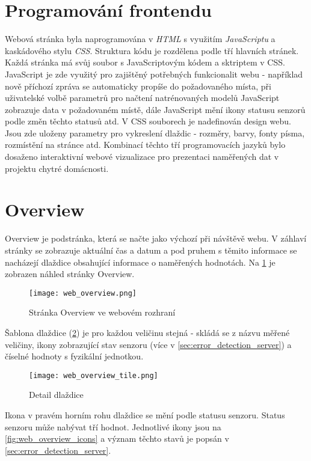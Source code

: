\section{Programování frontendu} \label{sec:frontend}
Webová stránka byla naprogramována v \textit{HTML} s využitím \textit{JavaScriptu} a kaskádového stylu \textit{CSS}. Struktura kódu je rozdělena podle tří hlavních stránek. Každá stránka má svůj soubor s JavaScriptovým kódem a sktriptem v CSS. JavaScript je zde využitý pro zajištěný potřebných funkcionalit webu - například nově příchozí zpráva se automaticky propíše do požadovaného místa, při uživatelské volbě parametrů pro načtení natrénovaných modelů JavaScript zobrazuje data v požadovaném místě, dále JavaScript mění ikony statusu senzorů podle změn těchto statusů atd. V CSS souborech je nadefinován design webu. Jsou zde uloženy parametry pro vykreslení dlaždic - rozměry, barvy, fonty písma, rozmístění na stránce atd. Kombinací těchto tří programovacích jazyků bylo dosaženo interaktivní webové vizualizace pro prezentaci naměřených dat v projektu chytré domácnosti.

\section{Overview} \label{sec:overview}

Overview je podstránka, která se načte jako výchozí při návštěvě webu. V záhlaví stránky se zobrazuje aktuální čas a datum a pod pruhem s těmito informace se nacházejí dlaždice obsahující informace o naměřených hodnotách. Na \cref{fig:web_overview} je zobrazen náhled stránky Overview. 

\begin{figure}[H]
  \centering
  \texttt{[image: web\_overview.png]}
  \caption{Stránka Overview ve webovém rozhraní}
  \label{fig:web_overview}
\end{figure}  

Šablona dlaždice (\cref{fig:web_overview_tile}) je pro každou veličinu stejná - skládá se z názvu měřené veličiny, ikony zobrazující stav senzoru (více v \cref{sec:error_detection_server}) a číselné hodnoty s fyzikální jednotkou.

\begin{figure}[H]
  \centering
  \texttt{[image: web\_overview\_tile.png]}
  \caption{Detail dlaždice}
  \label{fig:web_overview_tile}
\end{figure}

Ikona v pravém horním rohu dlaždice se mění podle statusu senzoru. Status senzoru může nabývat tří hodnot. Jednotlivé ikony jsou na \cref{fig:web_overview_icons} a význam těchto stavů je popsán v \cref{sec:error_detection_server}. 

